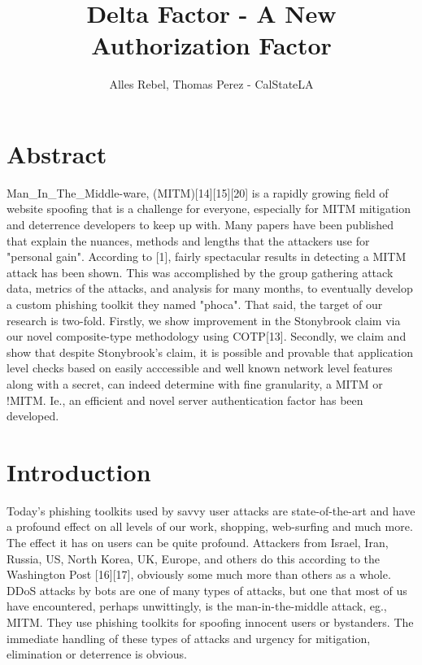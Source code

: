 \documentclass[a4paper, 11pt]{article} 				%
\title{Delta Factor - A New Authorization Factor}
\author{Alles Rebel, Thomas Perez - CalStateLA}
\begin{document}
\maketitle



\section{Abstract}
\setlength{\baselineskip}{1.5\baselineskip}
\noindent
Man\_In\_The\_Middle-ware, (MITM)[14][15][20] is a rapidly growing field of website spoofing that is a challenge for everyone, especially for MITM mitigation and deterrence  developers to keep up with. Many papers have been published that explain the nuances, methods and lengths that the attackers use for "personal gain". According to [1], fairly spectacular results in detecting a MITM attack has been shown. This was accomplished by the group gathering attack data, metrics of the attacks, and analysis for many months, to eventually develop a custom phishing toolkit they named "phoca". That said, the target of our research is two-fold. Firstly, we show improvement in the Stonybrook claim via our novel composite-type methodology using COTP[13].  Secondly, we claim and show that despite Stonybrook's claim, it is possible and provable that application level checks based on easily acccessible and well known network level features along with a secret, can indeed determine with fine granularity, a MITM or !MITM. Ie., an efficient and novel server authentication factor has been developed.  



\section{Introduction}
\noindent
Today’s phishing toolkits used by savvy user attacks are state-of-the-art and have a profound effect on all levels of our work, shopping, web-surfing and much more. The effect it has on users can be quite profound. Attackers from Israel, Iran, Russia, US, North Korea, UK, Europe, and others do this according to the Washington Post [16][17], obviously some much more than others as a whole. DDoS attacks by bots are one of many types of attacks, but one that most of us have encountered, perhaps unwittingly, is the  man-in-the-middle attack, eg., MITM. They use phishing toolkits for spoofing innocent users or bystanders. The immediate handling of these types of attacks and urgency for mitigation, elimination or deterrence is obvious. 
\end{document}
